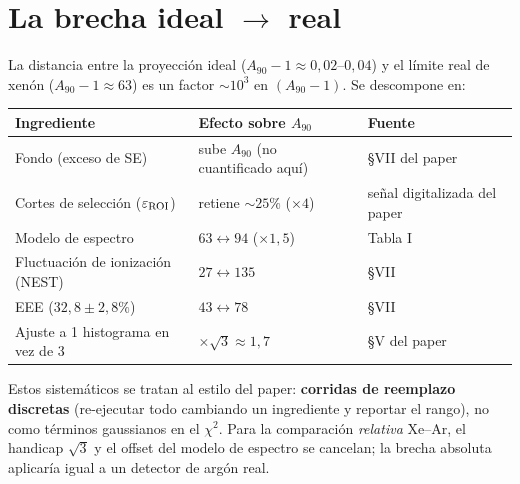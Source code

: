 \documentclass[11pt,a4paper]{article}
\newcommand{\Ne}{N_{e}}
\newcommand{\code}[1]{\texttt{#1}}
\begin{document}
\begin{table}[h]
\centering

\caption{Lectura inversa de la sensibilidad ideal: exposici\'on [kg$\cdot$d\'ia]
para alcanzar un $A_{90}$ de referencia, por umbral $\Ne\ge k$. Para
$A_{90}=1{,}05$ con $\Ne\ge4$, Xe necesita $\sim\SI{17000}{kg\cdot dia}$ y Ar
$\sim\SI{70}{kg\cdot dia}$. \code{python/expo\_to\_A90.py}.}
\label{tab:expo_A90}
\end{table}

\section{La brecha ideal $\to$ real}
\label{sec:brecha}

La distancia entre la proyecci\'on ideal ($A_{90}-1\approx 0{,}02$--$0{,}04$) y
el l\'imite real de xen\'on ($A_{90}-1\approx 63$) es un factor $\sim 10^{3}$ en
$(A_{90}-1)$. Se descompone en:
\begin{center}
\begin{tabular}{@{}lll@{}}
\toprule
Ingrediente & Efecto sobre $A_{90}$ & Fuente \\
\midrule
Fondo (exceso de SE)                 & sube $A_{90}$ (no cuantificado aqu\'i) & \S VII del paper \\
Cortes de selecci\'on ($\varepsilon_{\rm ROI}$) & retiene $\sim 25\%$ ($\times 4$) & se\~nal digitalizada del paper \\
Modelo de espectro                   & $63 \leftrightarrow 94$ ($\times 1{,}5$) & Tabla I \\
Fluctuaci\'on de ionizaci\'on (NEST) & $27 \leftrightarrow 135$ & \S VII \\
EEE ($32{,}8\pm 2{,}8\%$)            & $43 \leftrightarrow 78$ & \S VII \\
Ajuste a 1 histograma en vez de 3    & $\times\sqrt{3}\approx 1{,}7$ & \S V del paper \\
\bottomrule
\end{tabular}
\end{center}
Estos sistem\'aticos se tratan al estilo del paper: \textbf{corridas de
reemplazo discretas} (re-ejecutar todo cambiando un ingrediente y reportar el
rango), no como t\'erminos gaussianos en el $\chi^{2}$. Para la comparaci\'on
\emph{relativa} Xe--Ar, el handicap $\sqrt{3}$ y el offset del modelo de espectro
se cancelan; la brecha absoluta aplicar\'ia igual a un detector de arg\'on real.
\end{document}
